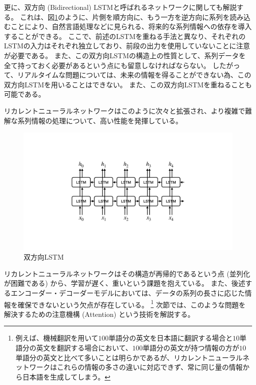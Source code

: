 更に、双方向 (Bidirectional) LSTMと呼ばれるネットワークに関しても解説する。
これは、図\ref{17BidirectionalLSTM}のように、片側を順方向に、もう一方を逆方向に系列を読み込むことにより、自然言語処理などに見られる、将来的な系列情報への依存を導入することができる。
ここで、前述のLSTMを重ねる手法と異なり、それぞれのLSTMの入力はそれぞれ独立しており、前段の出力を使用していないことに注意が必要である。
また、この双方向LSTMの構造上の性質として、系列データを全て持っておく必要があるという点にも留意しなければならない。
したがって、リアルタイムな問題については、未来の情報を得ることができない為、この双方向LSTMを用いることはできない。
また、この双方向LSTMを重ねることも可能である。

リカレントニューラルネットワークはこのように次々と拡張され、より複雑で難解な系列情報の処理について、高い性能を発揮している。

\begin{figure}[htbp]
 \centering
 \includegraphics[trim = 0 200 0 200, width=1.0\textwidth, clip]{Figure/2DeepLearning/17BidirectionalLSTM.png}
 \caption{双方向LSTM}
 \label{17BidirectionalLSTM}
\end{figure}

リカレントニューラルネットワークはその構造が再帰的であるという点 (並列化が困難である) から、学習が遅く、重いという課題を抱えている。
また、後述するエンコーダー・デコーダーモデルにおいては、データの系列の長さに応じた情報を確保できないという欠点が存在している。
\footnote{例えば、機械翻訳を用いて$100$単語分の英文を日本語に翻訳する場合と$10$単語分の英文を翻訳する場合において、$100$単語分の英文が持つ情報の方が$10$単語分の英文と比べて多いことは明らかであるが、リカレントニューラルネットワークはこれらの情報の多さの違いに対応できず、常に同じ量の情報から日本語を生成してしまう。}
次節では、このような問題を解決するための注意機構 (Attention) という技術を解説する。


